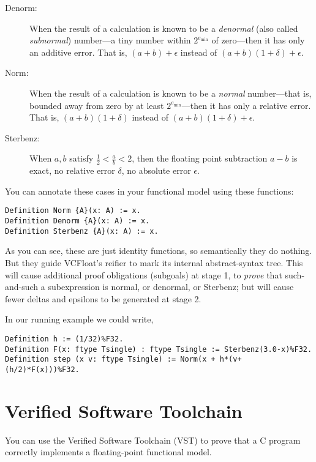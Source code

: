 \documentclass[article]{memoir}
\begin{document}
\begin{description}
\item[Denorm:]  When the result of a calculation is known to be a
  \emph{denormal} (also called \emph{subnormal}) number---a tiny
  number within $2^{e_\mathrm{min}}$ of zero---then it has only
  an additive error.  That is, $(a+b)+\epsilon$ instead of
  $(a+b)(1+\delta)+\epsilon$.
\item[Norm:]
   When the result of a calculation is known to be a
   \emph{normal} number---that is, bounded away from zero by
   at least $2^{e_\mathrm{min}}$---then it has only
  a relative error.  That is, $(a+b)(1+\delta)$ instead of
  $(a+b)(1+\delta)+\epsilon$.
\item[Sterbenz:]  When $a,b$ satisfy $\frac{1}{2} < \frac{a}{b} < 2$,
  then the floating point subtraction $a-b$ is exact, no relative
  error $\delta$, no absolute error $\epsilon$.
\end{description}

You can annotate these cases in your functional model using these functions:

\begin{lstlisting}
Definition Norm {A}(x: A) := x.
Definition Denorm {A}(x: A) := x.
Definition Sterbenz {A}(x: A) := x.
\end{lstlisting}

As you can see, these are just identity functions, so semantically they
do nothing.  But they guide VCFloat's reifier to mark its internal
abstract-syntax tree.  This will cause additional proof obligations
(subgoals) at stage 1, to \emph{prove} that such-and-such a subexpression
is normal, or denormal, or Sterbenz; but will cause fewer
deltas and epsilons to be generated at stage 2.

In our running example we could write,
\begin{lstlisting}
Definition h := (1/32)%F32.
Definition F(x: ftype Tsingle) : ftype Tsingle := Sterbenz(3.0-x)%F32.  
Definition step (x v: ftype Tsingle) := Norm(x + h*(v+(h/2)*F(x)))%F32.
\end{lstlisting}

\chapter{Verified Software Toolchain}

You can use the Verified Software Toolchain (VST) to prove that a C program
correctly implements a floating-point functional model.
\end{document}
